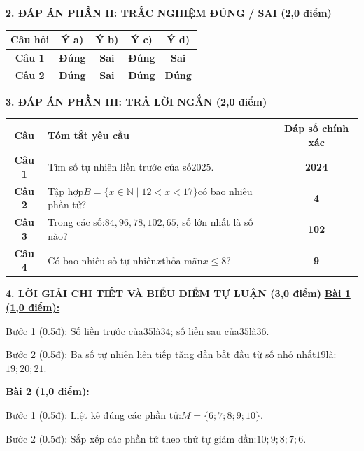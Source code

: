 \documentclass[11pt,a4paper]{article}
\begin{document}
\noindent\textbf{\large 2. ĐÁP ÁN PHẦN II: TRẮC NGHIỆM ĐÚNG / SAI (2,0 điểm)}
\vspace{4pt}
\begin{center}
\begin{tabular}{|c|c|c|c|c|}
\hline
\textbf{Câu hỏi} & \textbf{Ý a)} & \textbf{Ý b)} & \textbf{Ý c)} & \textbf{Ý d)} \\
\hline
\textbf{Câu 1} & \textbf{Đúng} & \textbf{Sai} & \textbf{Đúng} & \textbf{Sai} \\
\hline
\textbf{Câu 2} & \textbf{Đúng} & \textbf{Sai} & \textbf{Đúng} & \textbf{Đúng} \\
\hline
\end{tabular}
\end{center}
\vspace{6pt}


\noindent\textbf{\large 3. ĐÁP ÁN PHẦN III: TRẢ LỜI NGẮN (2,0 điểm)}
\vspace{4pt}
\begin{center}
\begin{tabular}{|c|m{11cm}|c|}
\hline
\textbf{Câu} & \textbf{Tóm tắt yêu cầu} & \textbf{Đáp số chính xác} \\
\hline
\textbf{Câu 1} & Tìm số tự nhiên liền trước của số$2025$. & \textbf{2024} \\
\hline
\textbf{Câu 2} & Tập hợp$B = \{x \in \mathbb{N} \mid 12 < x < 17\}$có bao nhiêu phần tử? & \textbf{4} \\
\hline
\textbf{Câu 3} & Trong các số:$84, 96, 78, 102, 65$, số lớn nhất là số nào? & \textbf{102} \\
\hline
\textbf{Câu 4} & Có bao nhiêu số tự nhiên$x$thỏa mãn$x \le 8$? & \textbf{9} \\
\hline
\end{tabular}
\end{center}
\vspace{6pt}


\noindent\textbf{\large 4. LỜI GIẢI CHI TIẾT VÀ BIỂU ĐIỂM TỰ LUẬN (3,0 điểm)}
\vspace{4pt}
\noindent\textbf{\underline{Bài 1 (1,0 điểm):}}\par\vspace{3pt}
Bước 1 (0.5đ): Số liền trước của$35$là$34$; số liền sau của$35$là$36$.\par\noindent Bước 2 (0.5đ): Ba số tự nhiên liên tiếp tăng dần bắt đầu từ số nhỏ nhất$19$là:$19; 20; 21$.\par\vspace{8pt}

\noindent\textbf{\underline{Bài 2 (1,0 điểm):}}\par\vspace{3pt}
Bước 1 (0.5đ): Liệt kê đúng các phần tử:$M = \{6; 7; 8; 9; 10\}$.\par\noindent Bước 2 (0.5đ): Sắp xếp các phần tử theo thứ tự giảm dần:$10; 9; 8; 7; 6$.\par\vspace{8pt}
\end{document}
